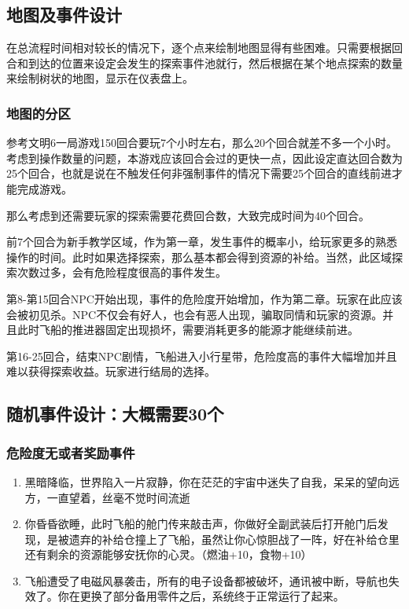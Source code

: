 \documentclass{ctexart}
\begin{document}
		\subsection{地图及事件设计}
		在总流程时间相对较长的情况下，逐个点来绘制地图显得有些困难。只需要根据回合和到达的位置来设定会发生的探索事件池就行，然后根据在某个地点探索的数量来绘制树状的地图，显示在仪表盘上。
		\subsubsection{地图的分区}
			参考文明6一局游戏150回合要玩7个小时左右，那么20个回合就差不多一个小时。考虑到操作数量的问题，本游戏应该回合会过的更快一点，因此设定直达回合数为25个回合，也就是说在不触发任何非强制事件的情况下需要25个回合的直线前进才能完成游戏。
			
			那么考虑到还需要玩家的探索需要花费回合数，大致完成时间为40个回合。
			
			前7个回合为新手教学区域，作为第一章，发生事件的概率小，给玩家更多的熟悉操作的时间。此时如果选择探索，那么基本都会得到资源的补给。当然，此区域探索次数过多，会有危险程度很高的事件发生。
			
			第8-第15回合NPC开始出现，事件的危险度开始增加，作为第二章。玩家在此应该会被初见杀。NPC不仅会有好人，也会有恶人出现，骗取同情和玩家的资源。并且此时飞船的推进器固定出现损坏，需要消耗更多的能源才能继续前进。
			
			第16-25回合，结束NPC剧情，飞船进入小行星带，危险度高的事件大幅增加并且难以获得探索收益。玩家进行结局的选择。
		\subsection{随机事件设计：大概需要30个} %
			\subsubsection{危险度无或者奖励事件}
			\begin{enumerate}
				\item 黑暗降临，世界陷入一片寂静，你在茫茫的宇宙中迷失了自我，呆呆的望向远方，一直望着，丝毫不觉时间流逝
				\item 你昏昏欲睡，此时飞船的舱门传来敲击声，你做好全副武装后打开舱门后发现，是被遗弃的补给仓撞上了飞船，虽然让你心惊胆战了一阵，好在补给仓里还有剩余的资源能够安抚你的心灵。（燃油+10，食物+10）
				\item 飞船遭受了电磁风暴袭击，所有的电子设备都被破坏，通讯被中断，导航也失效了。你在更换了部分备用零件之后，系统终于正常运行了起来。
			\end{enumerate}
\end{document}
